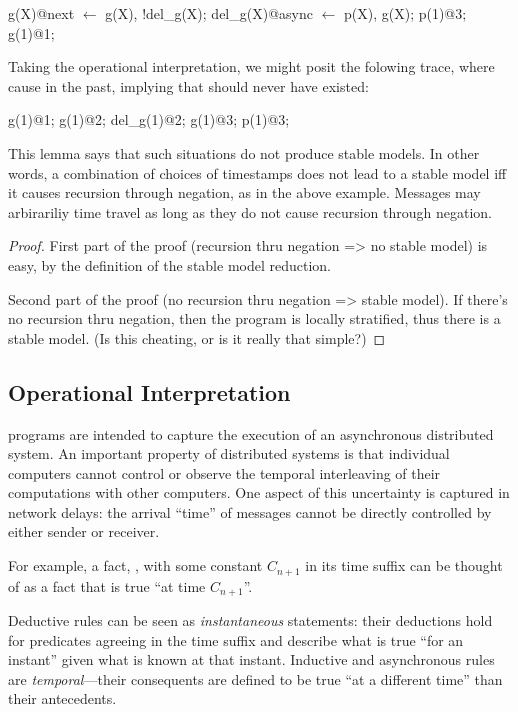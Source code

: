 \begin{Dedalus}
g(X)@next \(\leftarrow\) g(X), !del_g(X);
del_g(X)@async \(\leftarrow\) p(X), g(X);
p(1)@3;
g(1)@1;
\end{Dedalus}

Taking the operational interpretation, we might posit the folowing trace, where  cause  in the past, implying that  should never have existed:

\begin{Dedalus}
g(1)@1;
g(1)@2;
del_g(1)@2;
g(1)@3;
p(1)@3;
\end{Dedalus}

This lemma says that such situations do not produce stable models.  In other words, a combination of choices of timestamps does not lead to a stable model iff it causes recursion through negation, as in the above example.  Messages may arbirariliy time travel as long as they do not cause recursion through negation.

\begin{proof}

First part of the proof (recursion thru negation => no stable model) is easy, by the definition of the stable model reduction.

Second part of the proof (no recursion thru negation => stable model).  If there's no recursion thru negation, then the program is locally stratified, thus there is a stable model.  (Is this cheating, or is it really that simple?)

\end{proof}

\subsection{Operational Interpretation}
\lang programs are intended to capture the execution of an asynchronous distributed system.  An important property of distributed systems is that individual computers cannot control or observe the temporal interleaving of their computations with other computers.  One aspect of this uncertainty is captured in network delays: the arrival ``time'' of messages cannot be directly controlled by either sender or receiver.

For example, a fact, , with some constant $C_{n+1}$ in its time
suffix can be thought of as a fact that is true ``at time $C_{n+1}$''.

Deductive rules can be seen as {\em instantaneous} statements: their deductions hold for 
predicates agreeing in the time suffix and describe what is true ``for an instant'' given 
what is known at that instant.
 Inductive and asynchronous 
 rules are {\em temporal}---their consequents are defined to
be true ``at a different time'' than their antecedents.

